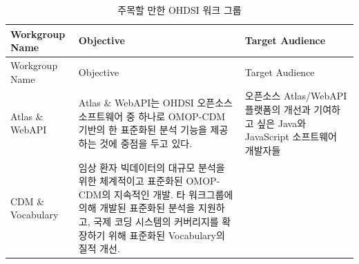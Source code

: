 \documentclass[11pt]{book}
\theoremstyle{definition}
\theoremstyle{definition}
\theoremstyle{definition}
\theoremstyle{remark}
\begin{document}
\begin{longtable}[]{@{}lll@{}}
\caption{\label{tab:OHDSIworkgroups} 주목할 만한 OHDSI 워크
그룹}\tabularnewline
\toprule
\begin{minipage}[b]{0.11\columnwidth}\raggedright\strut
Workgroup Name\strut
\end{minipage} & \begin{minipage}[b]{0.44\columnwidth}\raggedright\strut
Objective\strut
\end{minipage} & \begin{minipage}[b]{0.37\columnwidth}\raggedright\strut
Target Audience\strut
\end{minipage}\tabularnewline
\midrule
\endfirsthead
\toprule
\begin{minipage}[b]{0.11\columnwidth}\raggedright\strut
Workgroup Name\strut
\end{minipage} & \begin{minipage}[b]{0.44\columnwidth}\raggedright\strut
Objective\strut
\end{minipage} & \begin{minipage}[b]{0.37\columnwidth}\raggedright\strut
Target Audience\strut
\end{minipage}\tabularnewline
\midrule
\endhead
\begin{minipage}[t]{0.11\columnwidth}\raggedright\strut
Atlas \& WebAPI\strut
\end{minipage} & \begin{minipage}[t]{0.44\columnwidth}\raggedright\strut
Atlas \& WebAPI는 OHDSI 오픈소스 소프트웨어 중 하나로 OMOP-CDM 기반의 한
표준화된 분석 기능을 제공하는 것에 중점을 두고 있다.\strut
\end{minipage} & \begin{minipage}[t]{0.37\columnwidth}\raggedright\strut
오픈소스 Atlas/WebAPI 플랫폼의 개선과 기여하고 싶은 Java와 JavaScript
소프트웨어 개발자들\strut
\end{minipage}\tabularnewline
\begin{minipage}[t]{0.11\columnwidth}\raggedright\strut
CDM \& Vocabulary\strut
\end{minipage} & \begin{minipage}[t]{0.44\columnwidth}\raggedright\strut
임상 환자 빅데이터의 대규모 분석을 위한 체계적이고 표준화된 OMOP-CDM의
지속적인 개발. 타 워크그룹에 의해 개발된 표준화된 분석을 지원하고, 국제
코딩 시스템의 커버리지를 확장하기 위해 표준화된 Vocabulary의 질적
개선.\strut
\end{minipage} & \begin{minipage}[t]{0.37\columnwidth}\raggedright\strut

\end{minipage}
\end{longtable}
\end{document}
